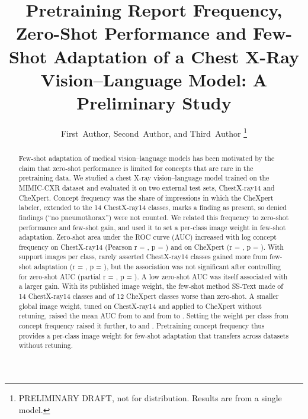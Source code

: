 \documentclass[journal]{IEEEtran}
\begin{document}
\title{Pretraining Report Frequency, Zero-Shot Performance and Few-Shot Adaptation of a Chest X-Ray
Vision--Language Model: A Preliminary Study}

\author{First~Author, Second~Author, and Third~Author
\thanks{PRELIMINARY DRAFT, not for distribution. Results are from a single model.}}

\maketitle

\begin{abstract}

Few-shot adaptation of medical vision--language models has been motivated by the claim that zero-shot performance is limited for concepts that are rare in the pretraining data. 
We studied a chest X-ray vision--language model trained on the MIMIC-CXR dataset and evaluated it on two external test sets, ChestX-ray14 and CheXpert.
Concept frequency was the share of impressions in which the CheXpert labeler, extended to the 14 ChestX-ray14 classes, marks a finding as present, so denied findings (``no pneumothorax'') were not counted.
We related this frequency to zero-shot performance and few-shot gain, and used it to set a per-class image weight in few-shot adaptation.
Zero-shot area under the ROC curve (AUC) increased with log concept frequency on ChestX-ray14 (Pearson r = \NihROne, p = \NihPOne) and on CheXpert (r = \CxpROne, p = \CxpPOne).
With \KRef{} support images per class, rarely asserted ChestX-ray14 classes gained more from few-shot adaptation (r = \NihRTwo, p = \NihPTwo), but the association was not significant after controlling for zero-shot AUC (partial r = \NihPartial, p = \NihPartialP).
A low zero-shot AUC was itself associated with a larger gain.
With its published image weight, the few-shot method SS-Text made \NihFcaBelow{} of 14 ChestX-ray14 classes and \CxpFcaBelow{} of 12 CheXpert classes worse than zero-shot.
A smaller global image weight, tuned on ChestX-ray14 and applied to CheXpert without retuning, raised the mean AUC from \NihFcaRef{} to \NihGlobalRef{} and from \CxpFcaRef{} to \CxpGlobalRef{}.
Setting the weight per class from concept frequency raised it further, to \NihRuleRef{} and \CxpRuleRef{}.
Pretraining concept frequency thus provides a per-class image weight for few-shot adaptation that transfers across datasets without retuning.



\end{abstract}
\end{document}

